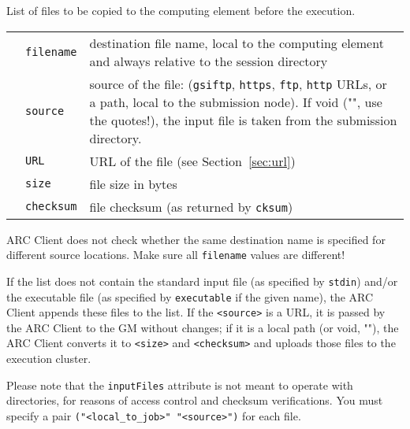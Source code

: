   List of files to be copied to the computing element before the
  execution.

  \begin{tabular}{llp{10cm}}
    \hspace*{1cm}&\texttt{filename} & destination file name, local to the computing element and
    always relative to the session directory\\
    \hspace*{1cm}&\texttt{source} & source of the file: (\texttt{gsiftp},
    \texttt{https}, \texttt{ftp}, \texttt{http} URLs, or a path, local
    to the submission node). If void ("", use the quotes!), the input file is taken
    from the submission directory.\\
    \hspace*{1cm}&\texttt{URL} & URL of the file (see Section~\ref{sec:url})\\
    \hspace*{1cm}&\texttt{size} & file size in bytes\\
    \hspace*{1cm}&\texttt{checksum} & file checksum (as returned by \texttt{cksum})\\
  \end{tabular}

  \begin{framed}
   ARC Client does not check whether the same destination name is specified for different source locations. Make sure all \texttt{filename} values are different!
  \end{framed}

  If the list does not contain the standard input file (as specified
  by \texttt{stdin}) and/or the executable file (as specified by
  \texttt{executable} if the given name), the ARC Client appends these files
  to the list. If the \verb#<source># is a URL, it is passed by the
  ARC Client to the GM without changes; if it is a local path (or void, ""),
  the ARC Client converts it to \verb#<size># and \verb#<checksum># and
  uploads those files to the execution cluster.

  \begin{framed}
  Please note that the \texttt{inputFiles} attribute is not meant to
  operate with directories, for reasons of access control and checksum verifications. You must specify a pair
  \verb#("<local_to_job>" "<source>")# for each file.
  \end{framed}

